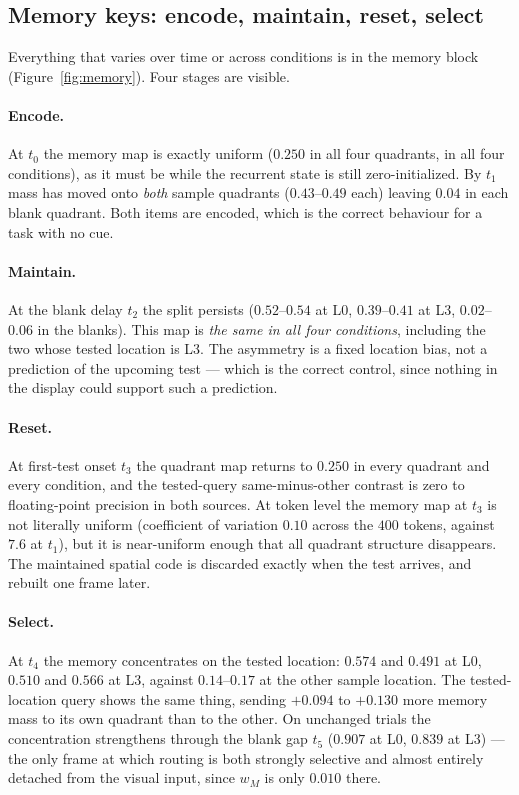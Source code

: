 \documentclass[10pt]{article}
\begin{document}
\subsection{Memory keys: encode, maintain, reset, select}

Everything that varies over time or across conditions is in the memory block
(Figure~\ref{fig:memory}). Four stages are visible.

\paragraph{Encode.} At $t_0$ the memory map is exactly uniform ($0.250$ in all four
quadrants, in all four conditions), as it must be while the recurrent state is still
zero-initialized. By $t_1$ mass has moved onto \emph{both} sample quadrants ($0.43$--$0.49$
each) leaving $0.04$ in each blank quadrant. Both items are encoded, which is the correct
behaviour for a task with no cue.

\paragraph{Maintain.} At the blank delay $t_2$ the split persists ($0.52$--$0.54$ at L0,
$0.39$--$0.41$ at L3, $0.02$--$0.06$ in the blanks). This map is \emph{the same in all four
conditions}, including the two whose tested location is L3. The asymmetry is a fixed
location bias, not a prediction of the upcoming test --- which is the correct control, since
nothing in the display could support such a prediction.

\paragraph{Reset.} At first-test onset $t_3$ the quadrant map returns to $0.250$ in every
quadrant and every condition, and the tested-query same-minus-other contrast is zero to
floating-point precision in both sources. At token level the memory map at $t_3$ is not
literally uniform (coefficient of variation $0.10$ across the $400$ tokens, against $7.6$ at
$t_1$), but it is near-uniform enough that all quadrant structure disappears. The
maintained spatial code is discarded exactly when the test arrives, and rebuilt one frame
later.

\paragraph{Select.} At $t_4$ the memory concentrates on the tested location: $0.574$ and
$0.491$ at L0, $0.510$ and $0.566$ at L3, against $0.14$--$0.17$ at the other sample
location. The tested-location query shows the same thing, sending $+0.094$ to $+0.130$ more
memory mass to its own quadrant than to the other. On unchanged trials the concentration
strengthens through the blank gap $t_5$ ($0.907$ at L0, $0.839$ at L3) --- the only frame at
which routing is both strongly selective and almost entirely detached from the visual input,
since $w_M$ is only $0.010$ there.
\end{document}
